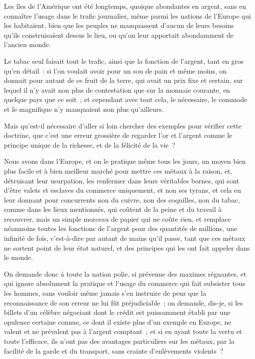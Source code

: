 \documentclass[french,twoside]{book} %
\begin{document}
Les îles de l’Amérique ont été longtemps, quoique abondantes en argent, sans en connaître l’usage dans le trafic journalier, même parmi les nations de l’Europe qui les habitaient, bien que les peuples ne manquassent d’aucun de leurs besoins qu’ils construisaient dessus le lieu, ou qu’on leur apportait abondamment de l’ancien monde.\par
Le tabac seul faisait tout le trafic, ainsi que la fonction de l’argent, tant en gros qu’en détail : si l’on voulait avoir pour un sou de pain et même moins, on donnait pour autant de ce fruit de la terre, qui avait un prix fixe et certain, sur lequel il n’y avait non plus de contestation que sur la monnaie courante, en quelque pays que ce soit ; et cependant avec tout cela, le nécessaire, le commode et le magnifique n’y manquaient non plus qu’ailleurs.\par
Mais qu’est-il nécessaire d’aller si loin chercher des exemples pour vérifier cette doctrine, que c’est une erreur grossière de regarder l’or et l’argent comme le principe unique de la richesse, et de la félicité de la vie ?\par
Nous avons dans l’Europe, et on le pratique même tous les jours, un moyen bien plus facile et à bien meilleur marché pour mettre ces métaux à la raison, et, détruisant leur usurpation, les renfermer dans leurs véritables bornes, qui sont d’être valets et esclaves du commerce uniquement, et non ses tyrans, et cela en leur donnant pour concurrents non du cuivre, non des coquilles, non du tabac, comme dans les lieux mentionnés, qui coûtent de la peine et du travail à recouvrer, mais un simple morceau de papier qui ne coûte rien, et remplace néanmoins toutes les fonctions de l’argent pour des quantités de millions, une infinité de fois, c’est-à-dire par autant de mains qu’il passe, tant que ces métaux ne sortent point de leur état naturel, et des principes qui les ont fait appeler dans le monde.\par
On demande donc à toute la nation polie, si prévenue des maximes régnantes, et qui ignore absolument la pratique et l’usage du commerce qui fait subsister tous les hommes, sans vouloir même jamais s’en instruire de peur que la reconnaissance de son erreur ne lui fût préjudiciable ; on demande, dis-je, si les billets d’un célèbre négociant dont le crédit est puissamment établi par une opulence certaine connue, ce dont il existe plus d’un exemple en Europe, ne valent et ne prévalent pas à l’argent comptant ; et si en ayant toute la vertu et toute l’efficace, ils n’ont pas des avantages particuliers sur les métaux, par la facilité de la garde et du transport, sans crainte d’enlèvements violents ?\par
\end{document}
